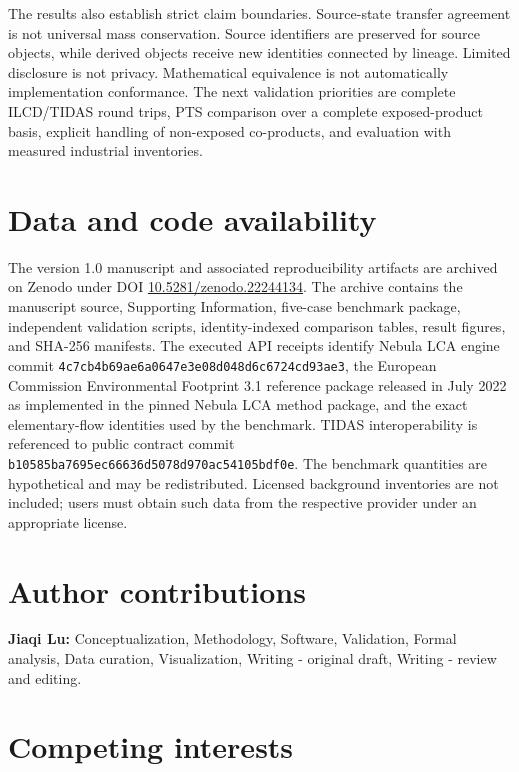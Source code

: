 \documentclass[
  10pt,
  a4paper,
  DIV=11,
  numbers=noendperiod]{scrartcl}
\begin{document}
The results also establish strict claim boundaries. Source-state
transfer agreement is not universal mass conservation. Source
identifiers are preserved for source objects, while derived objects
receive new identities connected by lineage. Limited disclosure is not
privacy. Mathematical equivalence is not automatically implementation
conformance. The next validation priorities are complete ILCD/TIDAS
round trips, PTS comparison over a complete exposed-product basis,
explicit handling of non-exposed co-products, and evaluation with
measured industrial inventories.

\section{Data and code availability}\label{data-and-code-availability}

The version 1.0 manuscript and associated reproducibility artifacts are
archived on Zenodo under DOI
\href{https://doi.org/10.5281/zenodo.22244134}{10.5281/zenodo.22244134}.
The archive contains the manuscript source, Supporting Information,
five-case benchmark package, independent validation scripts,
identity-indexed comparison tables, result figures, and SHA-256
manifests. The executed API receipts identify Nebula LCA engine commit
\texttt{4c7cb4b69ae6a0647e3e08d048d6c6724cd93ae3}, the European
Commission Environmental Footprint 3.1 reference package released in
July 2022 as implemented in the pinned Nebula LCA method package, and
the exact elementary-flow identities used by the benchmark. TIDAS
interoperability is referenced to public contract commit
\texttt{b10585ba7695ec66636d5078d970ac54105bdf0e}. The benchmark
quantities are hypothetical and may be redistributed. Licensed
background inventories are not included; users must obtain such data
from the respective provider under an appropriate license.

\section{Author contributions}\label{author-contributions}

\textbf{Jiaqi Lu:} Conceptualization, Methodology, Software, Validation,
Formal analysis, Data curation, Visualization, Writing - original draft,
Writing - review and editing.

\section{Competing interests}\label{competing-interests}
\end{document}
